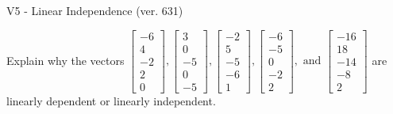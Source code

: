 \begin{exercise}
  \begin{exerciseTitle}V5 - Linear Independence (ver. 631)\end{exerciseTitle}
  \begin{exerciseStatement}
    Explain why the vectors \(\left[\begin{array}{r}
-6 \\
4 \\
-2 \\
2 \\
0
\end{array}\right] , \left[\begin{array}{r}
3 \\
0 \\
-5 \\
0 \\
-5
\end{array}\right] , \left[\begin{array}{r}
-2 \\
5 \\
-5 \\
-6 \\
1
\end{array}\right] , \left[\begin{array}{r}
-6 \\
-5 \\
0 \\
-2 \\
2
\end{array}\right] , \text{ and } \left[\begin{array}{r}
-16 \\
18 \\
-14 \\
-8 \\
2
\end{array}\right]\) are linearly dependent or linearly independent.	



\end{exerciseStatement}
\end{exercise}
